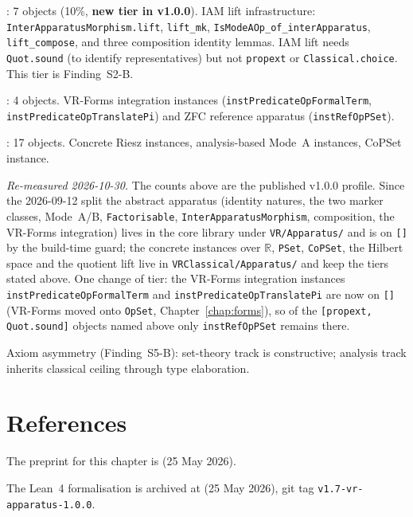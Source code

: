 : 7 objects (10\%, \textbf{new tier in v1.0.0}).
IAM lift infrastructure: \texttt{InterApparatusMorphism.lift},
\texttt{lift\_mk}, \texttt{IsModeAOp\_of\_interApparatus},
\texttt{lift\_compose}, and three composition identity lemmas.
IAM lift needs \texttt{Quot.sound} (to identify representatives) but not
\texttt{propext} or \texttt{Classical.choice}.
This tier is Finding~S2-B.

: 4 objects.
VR-Forms integration instances (\texttt{instPredicateOpFormalTerm},
\texttt{instPredicateOpTranslatePi}) and ZFC reference apparatus
(\texttt{instRefOpPSet}).

: 17 objects.
Concrete Riesz instances, analysis-based Mode~A instances, CoPSet instance.

\emph{Re-measured 2026-10-30.}  The counts above are the published v1.0.0 profile.
Since the 2026-09-12 split the abstract apparatus (identity natures, the two marker
classes, Mode~A/B, \texttt{Factorisable}, \texttt{InterApparatusMorphism}, composition,
the VR-Forms integration) lives in the core library under \texttt{VR/Apparatus/} and is
on \texttt{[]} by the build-time guard; the concrete instances over $\mathbb{R}$,
\texttt{PSet}, \texttt{CoPSet}, the Hilbert space and the quotient lift live in
\texttt{VRClassical/Apparatus/} and keep the tiers stated above.  One change of tier:
the VR-Forms integration instances \texttt{instPredicateOpFormalTerm} and
\texttt{instPredicateOpTranslatePi} are now on \texttt{[]} (VR-Forms moved onto
\texttt{OpSet}, Chapter~\ref{chap:forms}), so of the \texttt{[propext, Quot.sound]}
objects named above only \texttt{instRefOpPSet} remains there.

Axiom asymmetry (Finding~S5-B): set-theory track is constructive;
analysis track inherits classical ceiling through type elaboration.

\section{References}
\label{sec:apparatus_refs}

The preprint for this chapter is
 (25 May 2026).

The Lean~4 formalisation is archived at
 (25 May 2026),
git tag \texttt{v1.7-vr-apparatus-1.0.0}.

